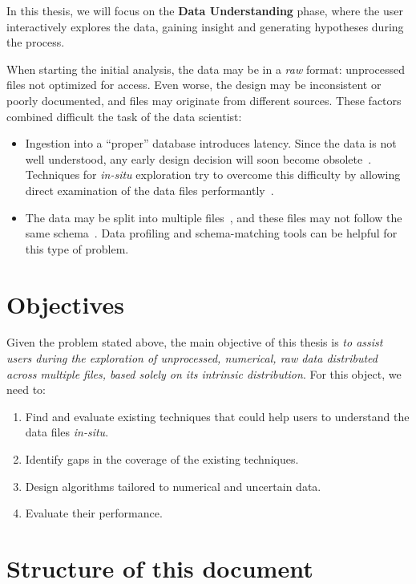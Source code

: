 In this thesis, we will focus on the \textbf{Data Understanding} phase, where the user interactively
explores the data, gaining insight and generating hypotheses during the process.

When starting the initial analysis, the data may be in a \emph{raw} format: unprocessed files not
optimized for access. Even worse, the design may be inconsistent or poorly documented, and files may
originate from different sources. These factors combined difficult the task of the data scientist:

\begin{itemize}
    \item Ingestion into a ``proper'' database introduces latency. Since the data is not well
        understood, any early design decision will soon become obsolete~\cite{Kersten2011}.
        Techniques for \emph{in-situ} exploration try to overcome this difficulty
        by allowing direct examination of the data files performantly~\cite{Idreos2011}.
    \item The data may be split into multiple files~\cite{Baud2012}, and these files may not
        follow the same schema~\cite{Alawini2014}. Data profiling and schema-matching tools
        can be helpful for this type of problem.
\end{itemize}

\section{Objectives}
\label{sec:main_objective}

Given the problem stated above, the main objective of this
thesis is \emph{to assist users during the exploration of unprocessed,
numerical, raw data distributed across multiple files,
based solely on its intrinsic distribution}. For this
object, we need to:

\begin{enumerate}
    \item Find and evaluate existing techniques that could help users to
    understand the data files \emph{in-situ}.
    \item Identify gaps in the coverage of the existing techniques.
    \item Design algorithms tailored to numerical and uncertain data.
    \item Evaluate their performance.
\end{enumerate}
\label{enum:objectives}

\section{Structure of this document}

